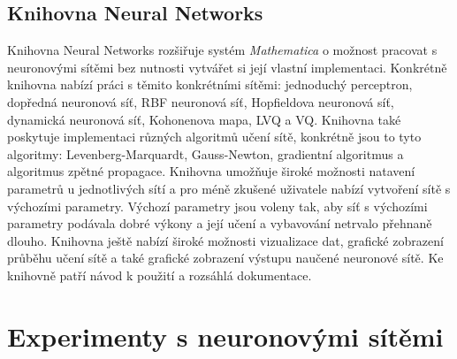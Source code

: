 \documentclass[11pt,twoside,a4paper]{book}
\begin{document}
\section{Knihovna Neural Networks}
Knihovna Neural Networks rozšiřuje systém \textit{Mathematica} o možnost pracovat s neuronovými sítěmi bez nutnosti vytvářet si její vlastní implementaci. Konkrétně knihovna nabízí práci s těmito konkrétními sítěmi: jednoduchý perceptron, dopředná neuronová síť, RBF neuronová síť, Hopfieldova neuronová síť, dynamická neuronová síť, Kohonenova mapa, LVQ a VQ. Knihovna také poskytuje implementaci různých algoritmů učení sítě, konkrétně jsou to tyto algoritmy: Levenberg-Marquardt, Gauss-Newton, gradientní algoritmus a algoritmus zpětné propagace. Knihovna umožňuje široké možnosti natavení parametrů u jednotlivých sítí a pro méně zkušené uživatele nabízí vytvoření sítě s výchozími parametry. Výchozí parametry jsou voleny tak, aby síť s výchozími parametry podávala dobré výkony a její učení a vybavování netrvalo přehnaně dlouho. Knihovna ještě nabízí široké možnosti vizualizace dat, grafické zobrazení průběhu učení sítě a také grafické zobrazení výstupu naučené neuronové sítě. Ke knihovně patří návod k použití a rozsáhlá dokumentace.
\chapter{Experimenty s neuronovými sítěmi}
\end{document}
